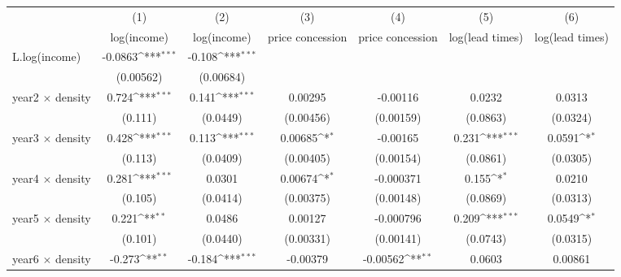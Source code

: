 {
\def\sym#1{\ifmmode^{#1}\else\(^{#1}\)\fi}
\begin{tabular}{l*{6}{c}}
\toprule
            &\multicolumn{1}{c}{(1)}&\multicolumn{1}{c}{(2)}&\multicolumn{1}{c}{(3)}&\multicolumn{1}{c}{(4)}&\multicolumn{1}{c}{(5)}&\multicolumn{1}{c}{(6)}\\
            &\multicolumn{1}{c}{log(income)}&\multicolumn{1}{c}{log(income)}&\multicolumn{1}{c}{price concession}&\multicolumn{1}{c}{price concession}&\multicolumn{1}{c}{log(lead times)}&\multicolumn{1}{c}{log(lead times)}\\
\midrule
L.log(income) &     -0.0863\sym{***}&      -0.108\sym{***}&                     &                     &                     &                     \\
            &   (0.00562)         &   (0.00684)         &                     &                     &                     &                     \\
\addlinespace
year2 $\times$ density&       0.724\sym{***}&       0.141\sym{***}&     0.00295         &    -0.00116         &      0.0232         &      0.0313         \\
            &     (0.111)         &    (0.0449)         &   (0.00456)         &   (0.00159)         &    (0.0863)         &    (0.0324)         \\
\addlinespace
year3 $\times$ density&       0.428\sym{***}&       0.113\sym{***}&     0.00685\sym{*}  &    -0.00165         &       0.231\sym{***}&      0.0591\sym{*}  \\
            &     (0.113)         &    (0.0409)         &   (0.00405)         &   (0.00154)         &    (0.0861)         &    (0.0305)         \\
\addlinespace
year4 $\times$ density&       0.281\sym{***}&      0.0301         &     0.00674\sym{*}  &   -0.000371         &       0.155\sym{*}  &      0.0210         \\
            &     (0.105)         &    (0.0414)         &   (0.00375)         &   (0.00148)         &    (0.0869)         &    (0.0313)         \\
\addlinespace
year5 $\times$ density&       0.221\sym{**} &      0.0486         &     0.00127         &   -0.000796         &       0.209\sym{***}&      0.0549\sym{*}  \\
            &     (0.101)         &    (0.0440)         &   (0.00331)         &   (0.00141)         &    (0.0743)         &    (0.0315)         \\
\addlinespace
year6 $\times$ density&      -0.273\sym{**} &      -0.184\sym{***}&    -0.00379         &    -0.00562\sym{**} &      0.0603         &     0.00861         \\

\end{tabular}}
